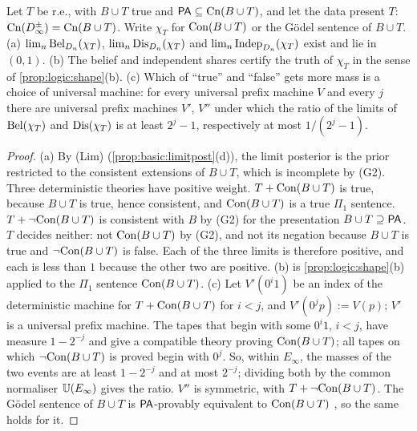 \begin{proposition}\label{prop:logic:con}
Let $T$ be r.e., with $B\cup T$ true and $\mathsf{PA}\subseteq\mathrm{Cn}(B\cup T)$, and let the data present $T$: $\mathrm{Cn}(D_\infty^\pm)=\mathrm{Cn}(B\cup T)$. Write $\chi_T$ for $\mathrm{Con}(B\cup T)$ or the Gödel sentence of $B\cup T$.
(a) $\lim_n\mathrm{Bel}_{D_n}(\chi_T)$, $\lim_n\mathrm{Dis}_{D_n}(\chi_T)$ and $\lim_n\mathrm{Indep}_{D_n}(\chi_T)$ exist and lie in $(0,1)$.
(b) The belief and independent shares certify the truth of $\chi_T$ in the sense of \cref{prop:logic:shape}(b).
(c) Which of ``true'' and ``false'' gets more mass is a choice of universal machine: for every universal prefix machine $V$ and every $j$ there are universal prefix machines $V'$, $V''$ under which the ratio of the limits of $\mathrm{Bel}(\chi_T)$ and $\mathrm{Dis}(\chi_T)$ is at least $2^j-1$, respectively at most $1/(2^j-1)$.
\end{proposition}

\begin{proof}
(a) By (Lim) (\cref{prop:basic:limitpost}(d)), the limit posterior is the prior restricted to the consistent extensions of $B\cup T$, which is incomplete by (G2). Three deterministic theories have positive weight. $T+\mathrm{Con}(B\cup T)$ is true, because $B\cup T$ is true, hence consistent, and $\mathrm{Con}(B\cup T)$ is a true $\Pi_1$ sentence. $T+\neg\mathrm{Con}(B\cup T)$ is consistent with $B$ by (G2) for the presentation $B\cup T\supseteq\mathsf{PA}$. $T$ decides neither: not $\mathrm{Con}(B\cup T)$ by (G2), and not its negation because $B\cup T$ is true and $\neg\mathrm{Con}(B\cup T)$ is false. Each of the three limits is therefore positive, and each is less than $1$ because the other two are positive. (b) is \cref{prop:logic:shape}(b) applied to the $\Pi_1$ sentence $\mathrm{Con}(B\cup T)$. (c) Let $V'(0^i1)$ be an index of the deterministic machine for $T+\mathrm{Con}(B\cup T)$ for $i<j$, and $V'(0^jp):=V(p)$; $V'$ is a universal prefix machine. The tapes that begin with some $0^i1$, $i<j$, have measure $1-2^{-j}$ and give a compatible theory proving $\mathrm{Con}(B\cup T)$; all tapes on which $\neg\mathrm{Con}(B\cup T)$ is proved begin with $0^j$. So, within $E_\infty$, the masses of the two events are at least $1-2^{-j}$ and at most $2^{-j}$; dividing both by the common normaliser $\mathbb{U}(E_\infty)$ gives the ratio. $V''$ is symmetric, with $T+\neg\mathrm{Con}(B\cup T)$. The Gödel sentence of $B\cup T$ is $\mathsf{PA}$-provably equivalent to $\mathrm{Con}(B\cup T)$ \citep{smorynski1977incompleteness}, so the same holds for it.
\end{proof}

